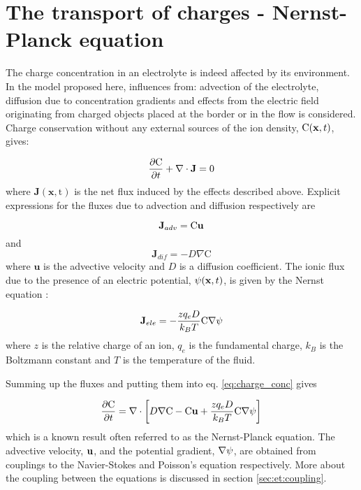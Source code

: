 \section{The transport of charges - Nernst-Planck equation}\label{sec:et:np}
The charge concentration in an electrolyte is indeed affected by its
environment. In the model proposed here, influences from: advection of
the electrolyte, diffusion due to concentration gradients and effects
from the electric field originating from charged objects placed at the
border or in the flow is considered. Charge conservation without any
external sources of the ion density, $\mathrm{C}(\mathbf{x}, t)$, gives:

\begin{equation}\label{eq:charge_conc}
\dfrac{\partial \mathrm{C}}{\partial t} + \nabla \cdot \mathbf{J} = 0
\end{equation}
where $\mathbf{J(\mathbf{x}, \mathrm{t})}$ is the net flux induced
by the effects described above. Explicit expressions for the fluxes
due to advection and diffusion respectively are 

\begin{equation}
\mathbf{J}_{adv} =
\mathrm{C}\mathbf{u}
\end{equation}
and 
\begin{equation}
\mathbf{J}_{dif} = -D\nabla \mathrm{C} 
\end{equation}
where $\mathbf{u}$ is the advective velocity and $D$ is a diffusion
coefficient. The ionic flux due to the presence of an electric
potential, $\mathrm{\psi}(\mathbf{x}, t)$, is given by the Nernst equation
\cite{dongquing-ren-book}:

\begin{equation}
\mathbf{J}_{ele} = -\frac{zq_eD}{k_BT}\mathrm{C}\nabla\mathrm{\psi}
\end{equation}
where $z$ is the relative charge of an ion, $q_e$ is the fundamental
charge, $k_B$ is the Boltzmann constant and $T$ is the temperature of the
fluid.

Summing up the fluxes and putting them into eq. \eqref{eq:charge_conc}
gives

\begin{equation}\label{np}
\dfrac{\partial \mathrm{C}}{\partial t} = \nabla \cdot \left [
 D\nabla \mathrm{C} - \mathrm{C}\mathbf{u} + \frac{zq_eD}{k_BT}\mathrm{C}\nabla\mathrm{\psi}
\right]
\end{equation}
which is a known result often referred to as the Nernst-Planck
equation. The advective velocity, $\mathbf{u}$, and the potential gradient,
$\nabla \mathrm{\psi}$, are obtained from couplings to the Navier-Stokes and
Poisson's equation respectively. More about the coupling between the
equations is discussed in section \ref{sec:et:coupling}.

